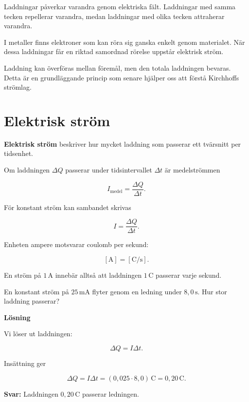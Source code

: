 \documentclass[
  swedish,
  11pt,
  a4paper,
  DIV=11,
  numbers=noendperiod,
  twoside,
  open=any]{scrreprt}
\begin{document}
Laddningar påverkar varandra genom elektriska fält. Laddningar med samma
tecken repellerar varandra, medan laddningar med olika tecken attraherar
varandra.

I metaller finns elektroner som kan röra sig ganska enkelt genom
materialet. När dessa laddningar får en riktad samordnad rörelse uppstår
elektrisk ström.

Laddning kan överföras mellan föremål, men den totala laddningen
bevaras. Detta är en grundläggande princip som senare hjälper oss att
förstå Kirchhoffs strömlag.

\section{Elektrisk ström}\label{sec-grunder-elektrisk-strom}

\textbf{Elektrisk ström} beskriver hur mycket laddning som passerar ett
tvärsnitt per tidsenhet.

Om laddningen \(\Delta Q\) passerar under tidsintervallet \(\Delta t\)
är medelströmmen

\[
I_\mathrm{medel} = \frac{\Delta Q}{\Delta t}.
\]

För konstant ström kan sambandet skrivas

\[
I = \frac{\Delta Q}{\Delta t}.
\]

Enheten ampere motsvarar coulomb per sekund:

\[
[\mathrm{A}] = [\mathrm{C/s}].
\]

En ström på \(1\,\mathrm{A}\) innebär alltså att laddningen
\(1\,\mathrm{C}\) passerar varje sekund.

\begin{tcolorbox}[enhanced jigsaw, arc=.35mm, bottomrule=.15mm, bottomtitle=1mm, breakable, colback=white, colbacktitle=quarto-callout-note-color!10!white, colframe=quarto-callout-note-color-frame, coltitle=black, left=2mm, leftrule=.75mm, opacityback=0, opacitybacktitle=0.6, rightrule=.15mm, title={Exempel: laddning som passerar en ledning}, titlerule=0mm, toprule=.15mm, toptitle=1mm]

En konstant ström på \(25\,\mathrm{mA}\) flyter genom en ledning under
\(8{,}0\,\mathrm{s}\). Hur stor laddning passerar?

\textbf{Lösning}

Vi löser ut laddningen:

\[
\Delta Q = I\Delta t.
\]

Insättning ger

\[
\Delta Q = I\Delta t
= (0{,}025 \cdot 8{,}0)\,\mathrm{C}
= 0{,}20\,\mathrm{C}.
\]

\textbf{Svar:} Laddningen \(0{,}20\,\mathrm{C}\) passerar ledningen.

\end{tcolorbox}
\end{document}
